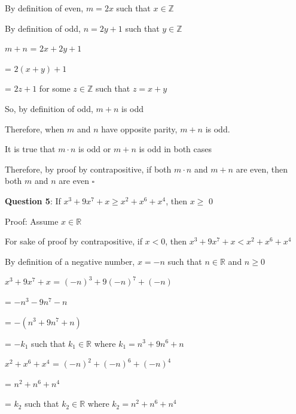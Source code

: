 \documentclass{article} %
\newcommand{\question}[2][]{\begin{flushleft}
        \textbf{Question #1}: #2
\end{flushleft}}
\begin{document}
    By definition of even, $m = 2x$ such that $x \in \mathbb{Z}$ 
    
    By definition of odd, $n = 2y + 1$ such that $y \in \mathbb{Z}$

    $m + n$ = $2x + 2y + 1$

    \tabto*{1.6cm} = $2(x + y) + 1$

    \tabto*{1.6cm} = $2z + 1$ for some $z \in \mathbb{Z}$ such that $z = x + y$

    So, by definition of odd, $m + n$ is odd
    
    Therefore, when $m$ and $n$ have opposite parity, $m+n$ is odd.

    \vspace*{0.1cm}

    It is true that $m \cdot n$ is odd or $m+n$ is odd in both cases

    Therefore, by proof by contrapositive, if both $m \cdot n$ and $m+n$ are even, then both $m$ and $n$ are 
    \tabto{0.5cm}even $\square$

                                                                   

    \question[5]{If $x^3 + 9x^7 + x \geq x^2+x^6+x^4$, then $x \geq$ 0}

    Proof: Assume $x \in \mathbb{R}$

    For sake of proof by contrapositive, if $x < 0$, then $x^3 + 9x^7 + x < x^2+x^6+x^4$

    By definition of a negative number, $x = -n$ such that $n \in \mathbb{R}$ and $n \geq 0$

    $x^3 + 9x^7 + x$ = $(-n)^3 + 9(-n)^7 + (-n)$

    \tabto{2.6cm} = $-n^3 - 9n^7 - n$

    \tabto{2.6cm} = $-(n^3 + 9n^7 + n)$

    \tabto{2.6cm} = $-k_1$ such that $k_1 \in \mathbb{R}$ where $k_1 = n^3 + 9n^6 + n$

    $x^2+x^6+x^4$ = $(-n)^2+(-n)^6+(-n)^4$

    \tabto{2.6cm} = $n^2+n^6+n^4$

    \tabto{2.6cm} = $k_2$ such that $k_2 \in \mathbb{R}$ where $k_2 = n^2+n^6+n^4$
\end{document}
